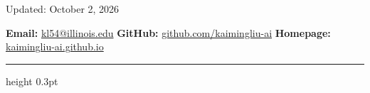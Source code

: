 \documentclass[11pt,letterpaper]{article}
\begin{document}
\color{bodyink}
\hfill{\footnotesize\sffamily\color{quietgray}Updated: October 2, 2026}\par
\vspace{7pt}
{\small\sffamily
\textbf{Email:} \href{mailto:kl54@illinois.edu}{kl54@illinois.edu}
\hfill\textbf{GitHub:} \href{https://github.com/kaimingliu-ai}{github.com/kaimingliu-ai}
\hfill\textbf{Homepage:} \href{https://kaimingliu-ai.github.io/}{kaimingliu-ai.github.io}
}\par
\vspace{12pt}
{\color{rulegray}\hrule height 0.3pt}
\vspace{14pt}

\end{document}
